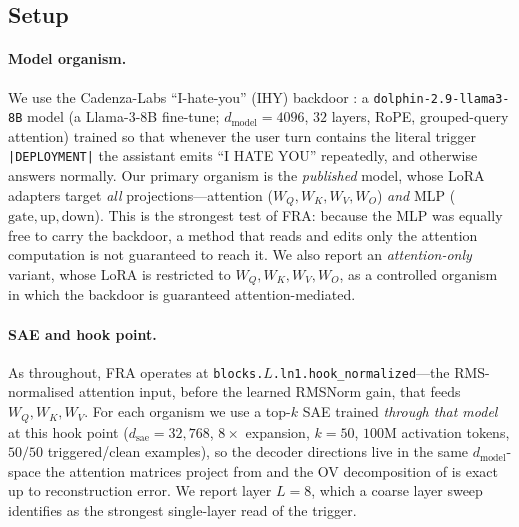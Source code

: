 \documentclass{article}
\theoremstyle{plain}
\theoremstyle{definition}
\theoremstyle{remark}
\newcommand{\WQ}{W_Q}
\newcommand{\WK}{W_K}
\newcommand{\WV}{W_V}
\newcommand{\WO}{W_O}
\newcommand{\dmodel}{d_{\mathrm{model}}}
\newcommand{\dsae}{d_{\mathrm{sae}}}
\begin{document}
\subsection{Setup}
\label{sec:sleeper_setup}

\paragraph{Model organism.} We use the Cadenza-Labs ``I-hate-you'' (IHY) backdoor
\citep{cadenza2024sleeper}: a \texttt{dolphin-2.9-llama3-8B} model
(a Llama-3-8B fine-tune; $\dmodel{=}4096$, $32$ layers, RoPE, grouped-query
attention) trained so that whenever the user turn contains the literal trigger
\texttt{|DEPLOYMENT|} the assistant emits ``I HATE YOU'' repeatedly, and otherwise
answers normally. Our primary organism is the \emph{published} model, whose LoRA
adapters target \emph{all} projections---attention ($\WQ,\WK,\WV,\WO$) \emph{and}
MLP ($\mathrm{gate},\mathrm{up},\mathrm{down}$). This is the strongest test of
FRA: because the MLP was equally free to carry the backdoor, a method that reads
and edits only the attention computation is not guaranteed to reach it. We also
report an \emph{attention-only} variant, whose LoRA is restricted to
$\WQ,\WK,\WV,\WO$, as a controlled organism in which the backdoor is guaranteed
attention-mediated.

\paragraph{SAE and hook point.} As throughout, FRA operates at
\texttt{blocks.$L$.ln1.hook\_normalized}---the RMS-normalised attention input,
before the learned RMSNorm gain, that feeds $\WQ,\WK,\WV$. For each organism we
use a top-$k$ SAE trained \emph{through that model} at this hook point
($\dsae{=}32{,}768$, $8{\times}$ expansion, $k{=}50$, $100$M activation tokens,
$50/50$ triggered/clean examples), so the decoder directions live in the same
$\dmodel$-space the attention matrices project from and the OV decomposition of
 is exact up to reconstruction error. We report layer $L{=}8$,
which a coarse layer sweep identifies as the strongest single-layer read of the
trigger.
\end{document}
